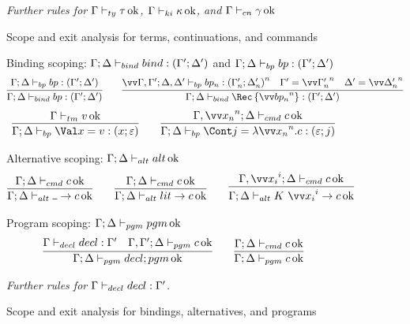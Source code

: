 \documentclass{article}
\begin{document}
\begin{figure}
\emph{Further rules for $\Gamma \vdash_{ty} \tau \operatorname{ok}$, $\Gamma \vdash_{ki} \kappa \operatorname{ok}$, and
  $\Gamma \vdash_{cn} \gamma \operatorname{ok}$}
\caption{Scope and exit analysis for terms, continuations, and commands}
\label{fig:scoping-rules}
\end{figure}

\begin{figure}
\centering

Binding scoping: $\Gamma; \Delta \vdash_{bind} bind : (\Gamma'; \Delta')$ and
$\Gamma; \Delta \vdash_{bp} bp : (\Gamma'; \Delta')$
\begin{gather*}
  \infer
  {\scopebind{\Gamma}{\Delta}{\nonrec{\bp}}{\Gamma'}{\Delta'}}
  {\scopebp{\Gamma}{\Delta}{\bp}{\Gamma'}{\Delta'}}
  \qquad
  \infer
  {\scopebind{\Gamma}{\Delta}{\rec{\vect[n]{\bp_n}}}{\Gamma'}{\Delta'}}
  {
    \vect[n]{
      \scopebp{\Gamma,\Gamma'}{\Delta,\Delta'}{\bp_n}{\Gamma'_n}{\Delta'_n}
    }
    &
    \Gamma' = \vect[n]{\Gamma'_n}
    &
    \Delta' = \vect[n]{\Delta'_n}
  }
\end{gather*}
\begin{gather*}
  \infer
  {\scopebp{\Gamma}{\Delta}{\bindv{x}{\tm}}{x}{\mt}}
  {\scopetm{\Gamma}{\tm}}
  \qquad
  \infer
  {\scopebp{\Gamma}{\Delta}{\bindk{j}{\fnk{\vect[n]{x_n}}\cmd}}{\mt}{j}}
  {\scopecmd{\Gamma,\vect[n]{x_n}}{\Delta}{\cmd}}
\end{gather*}

Alternative scoping: $\Gamma; \Delta \vdash_{alt} alt \operatorname{ok}$
\begin{gather*}
  \infer
  {\scopealt{\Gamma}{\Delta}{\alt{\blank}{\cmd}}}
  {\scopecmd{\Gamma}{\Delta}{\cmd}}
  \qquad
  \infer
  {\scopealt{\Gamma}{\Delta}{\alt{\lit}{\cmd}}}
  {\scopecmd{\Gamma}{\Delta}{\cmd}}
  \qquad
  \infer
  {\scopealt{\Gamma}{\Delta}{\alt{K ~ \vect[i]{x_i}}{\cmd}}}
  {\scopecmd{\Gamma,\vect[i]{x_i}}{\Delta}{\cmd}}
\end{gather*}

Program scoping: $\Gamma; \Delta \vdash_{pgm} pgm \operatorname{ok}$
\begin{gather*}
  \infer
  {\scopepgm{\Gamma}{\Delta}{\decl; \pgm}}
  {
    \scopedecl{\Gamma}{\decl}{\Gamma'}
    &
    \scopepgm{\Gamma,\Gamma'}{\Delta}{c}
  }
  \qquad
  \infer
  {\scopepgm{\Gamma}{\Delta}{\cmd}}
  {\scopecmd{\Gamma}{\Delta}{\cmd}}
\end{gather*}

\emph{Further rules for $\Gamma \vdash_{decl} decl : \Gamma'$.}
\caption{Scope and exit analysis for bindings, alternatives, and
  programs}
\label{fig:scoping-rules-binds}
\end{figure}
\end{document}
